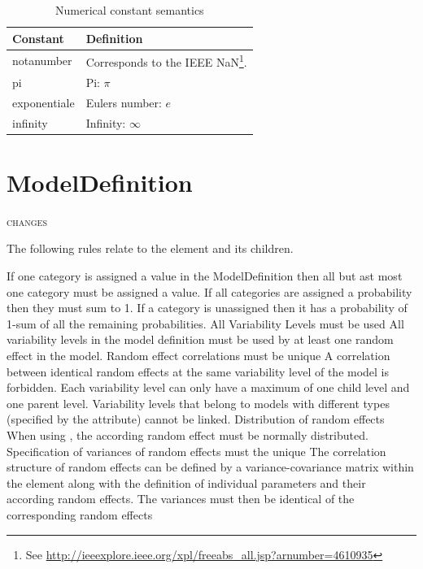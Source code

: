 \begin{table}[ht!]
\begin{center}
\small
\begin{tabular}{ll}\toprule
Constant & Definition \\ \midrule
notanumber & Corresponds to the IEEE NaN\footnote{See
  \url{http://ieeexplore.ieee.org/xpl/freeabs_all.jsp?arnumber=4610935}}.\\
pi & Pi: $\pi$\\
exponentiale & Eulers number: $e$\\
infinity & Infinity: $\infty$\\\bottomrule
\end{tabular}
\end{center}
\caption{Numerical constant semantics}
\label{tab:numerical-const-semantics}
\end{table}%


\section{ModelDefinition}
{\color{red} \scshape{changes}}

The following rules relate to the  element and
its children.

\begin{valrules}
If one category is assigned a value in the ModelDefinition then all
but ast most one category must be assigned a
value.
If all categories are assigned a probability then they must sum to 1. If a category is 
unassigned then it has a probability of 1-sum of all the remaining probabilities. 
 {All Variability Levels must be used} All variability
levels in the model definition must be used by at least one random
effect in the model.
 {Random effect correlations must be unique} A
correlation between identical random effects at the same variability
level of the model is forbidden.
 Each variability level can only have a maximum of one child
level and one parent level. Variability levels that belong to models
with different types (specified by the  attribute) cannot
be linked.
 {Distribution of random effects} When using , 
the according random effect must be normally distributed.
 {Specification of variances of random effects must the unique} 
The correlation structure of random effects can be defined by a variance-covariance 
matrix within the  element along with the definition of individual
parameters and their according random effects.
The variances must then be identical of the corresponding random effects 
\end{valrules}

